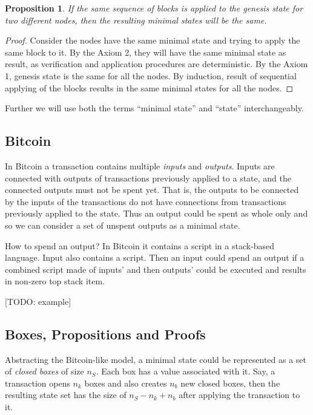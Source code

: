 \documentclass[]{report}   %
\newtheorem{proposition}{Proposition}
\begin{document}
	\begin{proposition} If the same sequence of blocks is applied to the genesis state for two different nodes, then the resulting minimal states will be the same.
	\end{proposition}	
	\begin{proof}Consider the nodes have the same minimal state and trying to apply the same block to it. By the Axiom 2, they will have the same minimal state as result, as verification and application procedures are deterministic. By the Axiom 1, genesis state is the same for all the nodes. By induction, result of sequential applying of the blocks results in the same minimal states for all the nodes.\end{proof}

Further we will use both the terms ``minimal state'' and ``state'' interchangeably. 


\subsection{Bitcoin}

In Bitcoin a transaction contains multiple \textit{inputs} and \textit{outputs}. Inputs are connected with outputs of transactions previously applied to a state, and the connected outputs must not be spent yet. That is, the outputs to be connected by the inputs of the transactions do not have connections from transactions previously applied to the state. Thus an output could be spent as whole only and so we can consider a set of unspent outputs as a minimal state.

How to spend an output? In Bitcoin it contains a script in a stack-based language. Input also contains a script. Then an input could spend an output if a combined script made of inputs' and then outputs' could be executed and results in non-zero top stack item.

[TODO: example]

\subsection{Boxes, Propositions and Proofs}

Abstracting the Bitcoin-like model, a minimal state could be represented as a set of \textit{closed boxes} of size \(n_S\). Each box has a value associated with it. Say, a transaction opens \(n_k\) boxes and also creates \(n_b\) new closed boxes, then the resulting state set has the size of \(n_S-n_k+n_b\) after applying the transaction to it. 
\end{document}

